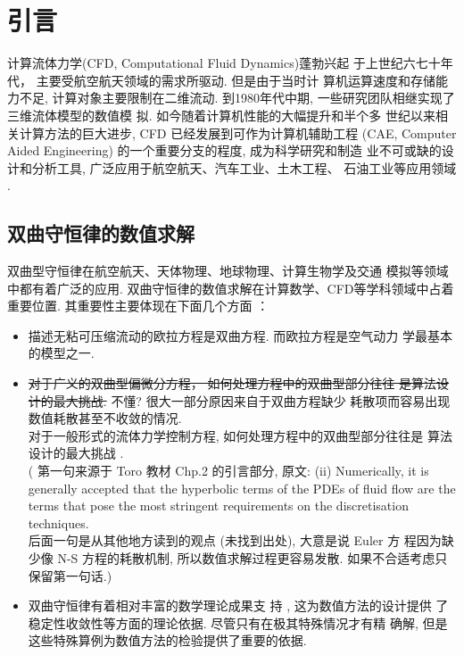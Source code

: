 
\chapter{引言}
\label{chap:introduction}

计算流体力学(CFD, Computational Fluid Dynamics)蓬勃兴起
于上世纪六七十年代， 主要受航空航天领域的需求所驱动.  但是由于当时计
算机运算速度和存储能力不足, 计算对象主要限制在二维流动.
到1980年代中期, 一些研究团队相继实现了三维流体模型的数值模
拟\cite{Venkatakrishnan1996}. 如今随着计算机性能的大幅提升和半个多
世纪以来相关计算方法的巨大进步, CFD 已经发展到可作为计算机辅助工程 (CAE, Computer
Aided Engineering) 的一个重要分支的程度,  成为科学研究和制造
业不可或缺的设计和分析工具, 广泛应用于航空航天、汽车工业、土木工程、
石油工业等应用领域 \cite{anderson1995book, blazek2006}.

\section{双曲守恒律的数值求解}
\label{sec:hyperbolic-conservation-law}

双曲型守恒律在航空航天、天体物理、地球物理、计算生物学及交通
模拟等领域\cite{Dumbser2016,Colombo2002}中都有着广泛的应用.
双曲守恒律的数值求解在计算数学、CFD等学科领域中占着重要位置.
其重要性主要体现在下面几个方面 \cite{Toro2009} ：
\begin{itemize}
\item 描述无粘可压缩流动的欧拉方程是双曲方程. 而欧拉方程是空气动力
  学最基本的模型之一.
\item \sout{对于广义的双曲型偏微分方程， 如何处理方程中的双曲型部分往往
    是算法设计的最大挑战.}
  {\color{red} 不懂? 很大一部分原因来自于双曲方程缺少
    耗散项而容易出现数值耗散甚至不收敛的情况. }\\
  对于一般形式的流体力学控制方程, 如何处理方程中的双曲型部分往往是
  算法设计的最大挑战 \cite{Toro2009}.\\
  ({\color{blue} 第一句来源于 Toro 教材 Chp.2 的引言部分, 原文:
    (ii) Numerically, it is generally accepted that the
    hyperbolic terms of the PDEs of fluid flow are the terms that
    pose the most stringent requirements on the discretisation
    techniques.\\
    后面一句是从其他地方读到的观点 (未找到出处), 大意是说 Euler 方
    程因为缺少像 N-S 方程的耗散机制, 所以数值求解过程更容易发散.
    如果不合适考虑只保留第一句话.})
\item 双曲守恒律有着相对丰富的数学理论成果支
  持 \cite{DiPerna1979,Lax1973,Glimm1965}, 这为数值方法的设计提供
  了稳定性收敛性等方面的理论依据. 尽管只有在极其特殊情况才有精
  确解, 但是这些特殊算例为数值方法的检验提供了重要的依据.
\end{itemize}

